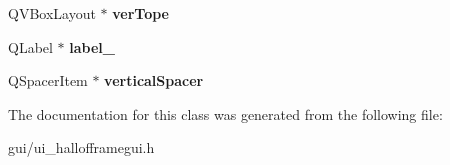 \begin{DoxyCompactItemize}
Q\+V\+Box\+Layout $\ast$ {\bfseries ver\+Tope}
\item 
\mbox{\label{class_ui___hall_of_frame_gui_ac5e0740c5109f994ecd736da6575b40c}} 
Q\+Label $\ast$ {\bfseries label\+\_}
\item 
\mbox{\label{class_ui___hall_of_frame_gui_a8347a28a7046d2f42e759b521ffbe3e1}} 
Q\+Spacer\+Item $\ast$ {\bfseries vertical\+Spacer}
\end{DoxyCompactItemize}


The documentation for this class was generated from the following file\+:\begin{DoxyCompactItemize}
\item 
gui/ui\+\_\+hallofframegui.\+h\end{DoxyCompactItemize}
